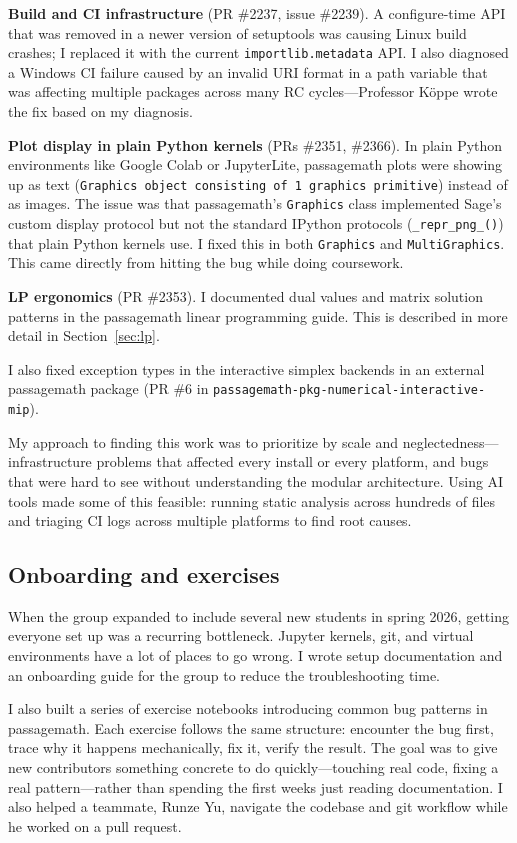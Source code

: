 \documentclass[10pt]{article}
\begin{document}
\textbf{Build and CI infrastructure} (PR \#2237, issue \#2239). A configure-time API that was
removed in a newer version of setuptools was causing Linux build crashes; I replaced it with the
current \texttt{importlib.metadata} API. I also diagnosed a Windows CI failure caused by an
invalid URI format in a path variable that was affecting multiple packages across many RC
cycles---Professor K\"oppe wrote the fix based on my diagnosis.

\textbf{Plot display in plain Python kernels} (PRs \#2351, \#2366). In plain Python
environments like Google Colab or JupyterLite, passagemath plots were showing up as text
(\texttt{Graphics object consisting of 1 graphics primitive}) instead of as images. The issue
was that passagemath's \texttt{Graphics} class implemented Sage's custom display protocol but
not the standard IPython protocols (\texttt{\_repr\_png\_()}) that plain Python kernels use. I
fixed this in both \texttt{Graphics} and \texttt{MultiGraphics}. This came directly from hitting
the bug while doing coursework.

\textbf{LP ergonomics} (PR \#2353). I documented dual values and matrix solution patterns in
the passagemath linear programming guide. This is described in more detail in
Section~\ref{sec:lp}.

I also fixed exception types in the interactive simplex backends in an external passagemath
package (PR \#6 in \texttt{passagemath-pkg-numerical-interactive-mip}).

My approach to finding this work was to prioritize by scale and neglectedness---infrastructure
problems that affected every install or every platform, and bugs that were hard to see without
understanding the modular architecture. Using AI tools made some of this feasible: running
static analysis across hundreds of files and triaging CI logs across multiple platforms to find
root causes.

\subsection{Onboarding and exercises}

When the group expanded to include several new students in spring 2026, getting everyone set up
was a recurring bottleneck. Jupyter kernels, git, and virtual environments have a lot of places
to go wrong. I wrote setup documentation and an onboarding guide for the group to reduce the
troubleshooting time.

I also built a series of exercise notebooks introducing common bug patterns in passagemath. Each
exercise follows the same structure: encounter the bug first, trace why it happens mechanically,
fix it, verify the result. The goal was to give new contributors something concrete to do
quickly---touching real code, fixing a real pattern---rather than spending the first weeks just
reading documentation. I also helped a teammate, Runze Yu, navigate the codebase and git
workflow while he worked on a pull request.
\end{document}
